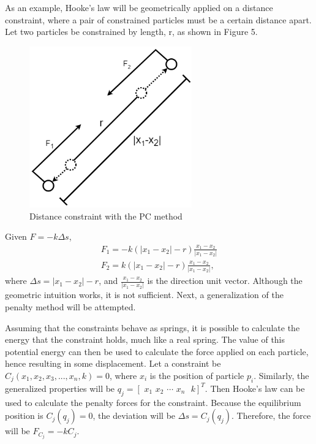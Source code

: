 \documentclass[12pt, letterpaper]{article}
\begin{document}
As an example, Hooke's law will be geometrically applied on a distance constraint, where a pair of constrained particles must be a certain distance apart. Let two particles be constrained by length, r, as shown in Figure 5.
\begin{figure}[H]
\centering
\includegraphics[width=7cm]{pc diagram.png}
\caption{Distance constraint with the PC method}
\label{fig:figure}
\end{figure} 
\noindent Given $F = -k\Delta s$,
\begin{equation}
    \begin{gathered}
        F_{1}=-k(|x_{1}-x_{2}|-r)\frac{x_{1}-x_{2}}{|x_{1}-x_{2}|}\\
        F_{2}=k(|x_{1}-x_{2}|-r)\frac{x_{1}-x_{2}}{|x_{1}-x_{2}|},
    \end{gathered}
\end{equation}
 where $\Delta s = |x_{1} - x_{2}| - r$, and $\frac{x_{1} - x_{2}}{|x_{1} - x_{2}|}$ is the direction unit vector. Although the geometric intuition works, it is not sufficient. Next, a generalization of the penalty method will be attempted. 

Assuming that the constraints behave as springs, it is possible to calculate the energy that the constraint holds, much like a real spring. The value of this potential energy can then be used to calculate the force applied on each particle, hence resulting in some displacement. 
Let a constraint be $C_j(x_{1},x_{2},x_{3}, . . . , x_{n}, k) = 0$, where $x_i$ is the position of particle $p_i$. Similarly, the generalized properties will be $q_j = [\hspace{4pt}x_{1} \hspace{4pt} x_{2} \hspace{4pt} \cdots \hspace{4pt} x_{n}\hspace{4pt}\hspace{4pt} k] ^ {T}$. Then Hooke's law can be used to calculate the penalty forces for the constraint. Because the equilibrium position is $C_j(q_j) = 0$, the deviation will be $ \Delta s = C_j(q_j)$. Therefore, the force will be $F_{C_j} = -kC_j$.
\end{document}
